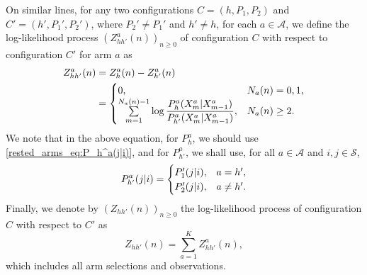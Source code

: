On similar lines, for any two configurations $C=(h,P_1,P_2)$ and $C'=(h',P_1',P_2')$, where $P_2'\neq P_1'$ and $h'\neq h$, for each $a\in\mathcal{A}$, we define the log-likelihood process $(Z_{hh'}^a(n))_{n\geq 0}$ of configuration $C$ with respect to configuration $C'$ for arm $a$ as
\begingroup\allowdisplaybreaks\begin{align}
	Z_{hh'}^a(n)&=Z_h^a(n)-Z_{h'}^a(n)\nonumber\\
	&=\begin{cases}0,& N_a(n)=0,1,\\
	\sum\limits_{m=1}^{N_a(n)-1}\log \dfrac{P_{h}^{a}(X_m^a|X_{m-1}^a)}{P_{h'}^{a}(X_m^a|X_{m-1}^a)},& N_a(n)\geq 2.\label{rested_arms_eq:Z_{hh'}^a(n)}
\end{cases}
\end{align}\endgroup
We note that in the above equation, for $P_h^a$, we should use \eqref{rested_arms_eq:P_h^a(j|i)}, and for $P_{h'}^a$, we shall use, for all $a\in\mathcal{A}$ and $i,j\in\mathcal{S}$,
\begin{equation}
	P_{h'}^a(j|i)=\begin{cases}
		P_1'(j|i),&a=h',\\
		P_2'(j|i),&a\neq h'.
	\end{cases}
	\label{rested_arms_eq:P_{h'}^a(j|i)}
\end{equation}
Finally, we denote by $(Z_{hh'}(n))_{n\geq 0}$ the log-likelihood process of configuration $C$ with respect to $C'$ as
\begin{equation}
	Z_{hh'}(n)=\sum\limits_{a=1}^{K}Z_{hh'}^a(n),\label{rested_arms_eq:log_likelihood_under_hyp_h_and_h'}
\end{equation}
which includes all arm selections and observations.

